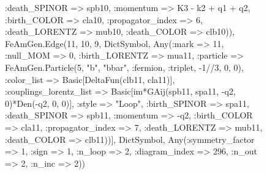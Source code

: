 \documentclass{revtex4}
\begin{document}
\begin{figure}[!htb]
\begin{center}
{:death_SPINOR => spb10, :momentum => K3 - k2 + q1 + q2, :birth_COLOR => cla10, :propagator_index => 6, :death_LORENTZ => mub10, :death_COLOR => clb10)), FeAmGen.Edge(11, 10, 9, Dict{Symbol, Any}(:mark => 11, :null_MOM => 0, :birth_LORENTZ => mua11, :particle => FeAmGen.Particle(5, "b", "bbar", :fermion, :triplet, -1//3, 0, 0), :color_list => Basic[DeltaFun(clb11, cla11)], :couplings_lorentz_list => Basic[im*GAij(spb11, spa11, -q2, 0)*Den(-q2, 0, 0)], :style => "Loop", :birth_SPINOR => spa11, :death_SPINOR => spb11, :momentum => -q2, :birth_COLOR => cla11, :propagator_index => 7, :death_LORENTZ => mub11, :death_COLOR => clb11))], Dict{Symbol, Any}(:symmetry_factor => 1, :sign => 1, :n_loop => 2, :diagram_index => 296, :n_out => 2, :n_inc => 2)) 
}
\end{center}
\end{figure}
\end{document}
